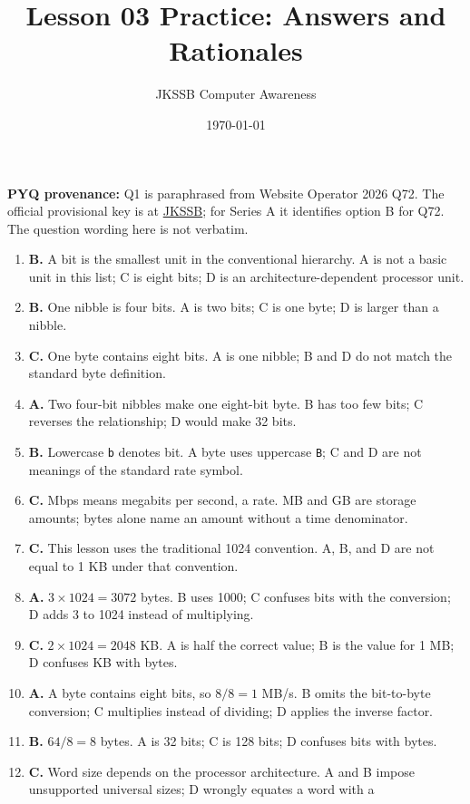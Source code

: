 \documentclass[11pt]{article}
\title{Lesson 03 Practice: Answers and Rationales}
\author{JKSSB Computer Awareness}
\date{\today}
\begin{document}
\maketitle
\noindent\textbf{PYQ provenance:} Q1 is paraphrased from Website Operator
2026 Q72. The official provisional key is at
\href{https://jkssb.nic.in/Pdf/PROVISIONAL\_ANSWERKEY\_WEBSITEOPERATOR\_08022026.pdf}
{JKSSB}; for Series A it identifies option B for Q72. The question wording
here is not verbatim.
\begin{enumerate}[label=\textbf{Q\arabic*.}, leftmargin=*]
\item \textbf{B.} A bit is the smallest unit in the conventional hierarchy.
  A is not a basic unit in this list; C is eight bits; D is an
  architecture-dependent processor unit.
\item \textbf{B.} One nibble is four bits. A is two bits; C is one byte; D is
  larger than a nibble.
\item \textbf{C.} One byte contains eight bits. A is one nibble; B and D do
  not match the standard byte definition.
\item \textbf{A.} Two four-bit nibbles make one eight-bit byte. B has too
  few bits; C reverses the relationship; D would make 32 bits.
\item \textbf{B.} Lowercase \texttt{b} denotes bit. A byte uses uppercase
  \texttt{B}; C and D are not meanings of the standard rate symbol.
\item \textbf{C.} Mbps means megabits per second, a rate. MB and GB are
  storage amounts; bytes alone name an amount without a time denominator.
\item \textbf{C.} This lesson uses the traditional 1024 convention. A, B,
  and D are not equal to 1 KB under that convention.
\item \textbf{A.} $3\times1024=3072$ bytes. B uses 1000; C confuses bits
  with the conversion; D adds 3 to 1024 instead of multiplying.
\item \textbf{C.} $2\times1024=2048$ KB. A is half the correct value; B is
  the value for 1 MB; D confuses KB with bytes.
\item \textbf{A.} A byte contains eight bits, so $8/8=1$ MB/s. B omits the
  bit-to-byte conversion; C multiplies instead of dividing; D applies the
  inverse factor.
\item \textbf{B.} $64/8=8$ bytes. A is 32 bits; C is 128 bits; D confuses
  bits with bytes.
\item \textbf{C.} Word size depends on the processor architecture. A and B
  impose unsupported universal sizes; D wrongly equates a word with a

\end{enumerate}
\end{document}
